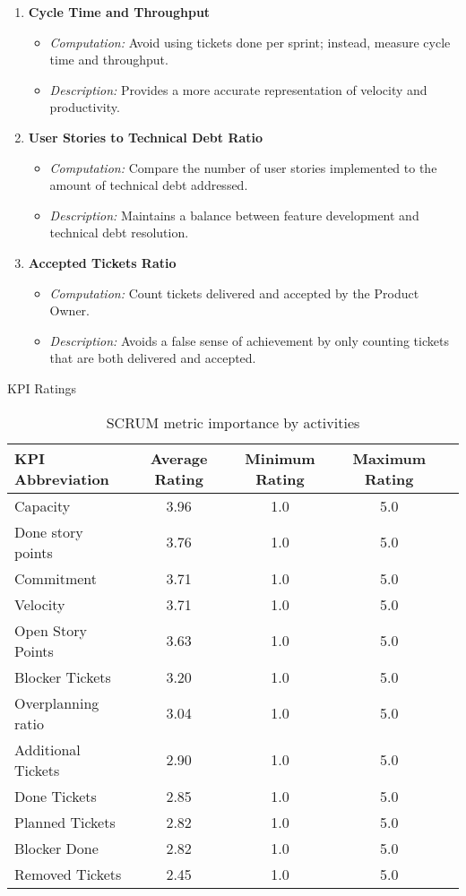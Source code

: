 \begin{enumerate}
    \item \textbf{Cycle Time and Throughput}
    \begin{itemize}
        \item \textit{Computation:} Avoid using tickets done per sprint; instead, measure cycle time and throughput.
        \item \textit{Description:} Provides a more accurate representation of velocity and productivity.
    \end{itemize}

    \item \textbf{User Stories to Technical Debt Ratio}
    \begin{itemize}
        \item \textit{Computation:} Compare the number of user stories implemented to the amount of technical debt addressed.
        \item \textit{Description:} Maintains a balance between feature development and technical debt resolution.
    \end{itemize}

    \item \textbf{Accepted Tickets Ratio}
    \begin{itemize}
        \item \textit{Computation:} Count tickets delivered and accepted by the Product Owner.
        \item \textit{Description:} Avoids a false sense of achievement by only counting tickets that are both delivered and accepted.
    \end{itemize}
\end{enumerate}


\begin{table}[!h]
    \centering
    \caption{KPI Ratings}
    \begin{tabular}{lcccc}
        \toprule
        KPI Abbreviation & Average Rating & Minimum Rating & Maximum Rating \\
        \midrule
        Capacity & 3.96 & 1.0 & 5.0 \\
        Done story points & 3.76 & 1.0 & 5.0 \\
        Commitment & 3.71 & 1.0 & 5.0 \\
        Velocity & 3.71 & 1.0 & 5.0 \\
        Open Story Points & 3.63 & 1.0 & 5.0 \\
        Blocker Tickets & 3.20 & 1.0 & 5.0 \\
        Overplanning ratio & 3.04 & 1.0 & 5.0 \\
        Additional Tickets & 2.90 & 1.0 & 5.0 \\
        Done Tickets & 2.85 & 1.0 & 5.0 \\
        Planned Tickets & 2.82 & 1.0 & 5.0 \\
        Blocker Done & 2.82 & 1.0 & 5.0 \\
        Removed Tickets & 2.45 & 1.0 & 5.0 \\
    \end{tabular}
    \decoRule
    \caption[SCRUM metrics]{SCRUM metric importance by activities}
    \label{tab:kpi_ratings}
\end{table}

